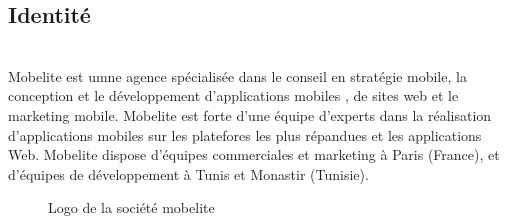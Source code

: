 \subsection{\Large   Identité }
\texttt{}\\[0.5cm]
\textsf{\selectfont{} Mobelite est umne agence spécialisée dans le conseil en stratégie mobile, la conception et le développement d’applications mobiles , de sites web et le marketing mobile. Mobelite est forte d’une équipe d’experts dans la réalisation d’applications mobiles sur les platefores les plus répandues et les applications Web. Mobelite dispose d’équipes commerciales et marketing à Paris (France), et d’équipes de développement à Tunis et Monastir (Tunisie).
}
\texttt{}\\[0.1cm]
\begin{figure}[H]
    \begin{center}
    

    \end{center}
    
    \caption{Logo de la société mobelite}
\end{figure}
\newpage
